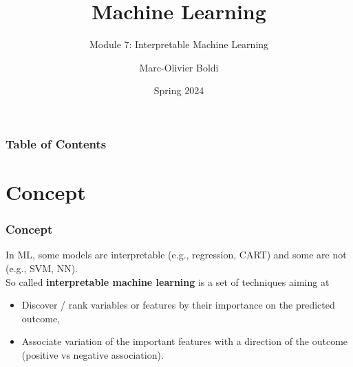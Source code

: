 
\title{Machine Learning}
\subtitle{Module 7: Interpretable Machine Learning}
\author[MOB]{Marc-Olivier Boldi}
\date[Spring 2024]{Spring 2024}

\begin{frame}
  \titlepage
\end{frame}
\begin{frame}
\frametitle{Table of Contents}
	\tableofcontents
\end{frame}
\section{Concept}
\begin{frame}
\frametitle{Concept}
In ML, some models are interpretable (e.g., regression, CART) and some are not (e.g., SVM, NN). \\
\vspace{0.3cm}
So called {\bf interpretable machine learning} is a set of techniques aiming at
\begin{itemize}
\item Discover / rank variables or features by their importance on the predicted outcome,
\item Associate variation of the important features with a direction of the outcome (positive vs negative association).
\end{itemize}
\end{frame}
